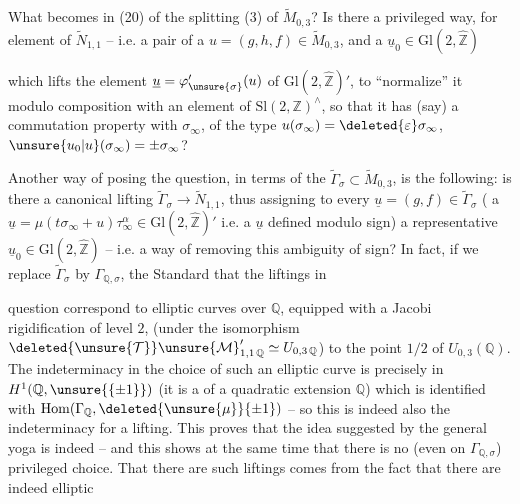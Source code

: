 What becomes in (20) of the splitting (3) of $\widetilde{M}_{0,3}$? Is there a privileged way, for  element of $\widetilde{N}_{1,1}$ -- i.e. a pair of a $u=(g,h,f)\in\widetilde{M}_{0,3}$, and a $\underline{u}_0\in\mathrm{Gl}(2,\widehat{\mathbb Z})$


which lifts the element $\underline{u}=\varphi'_{\unsure{\sigma}}(u)$ of $\mathrm{Gl}(2,\widehat{\mathbb Z})'$, to ``normalize'' it modulo  composition with an element of $\mathrm{Sl}(2,\mathbb Z)^\wedge$, so that it has  (say) a commutation property with $\sigma_\infty$, of the type $u(\sigma_\infty)=\deleted{\varepsilon}\sigma_\infty$,  $\unsure{u_0|u}(\sigma_\infty)=\pm\sigma_\infty$?

Another way of posing the question, in terms of the  $\widetilde{\Gamma}_\sigma\subset\widetilde{M}_{0,3}$, is the following: is there a canonical lifting $\widetilde{\Gamma}_\sigma\longrightarrow\widetilde{N}_{1,1}$, thus assigning to every $\underline{u}=(g,f)\in\widetilde{\Gamma}_\sigma$ ( a $\underline{u}=\mu(t\sigma_\infty+u)\tau_\infty^\alpha\in\mathrm{Gl}(2,\widehat{\mathbb Z})'$\unsure{,|\}}  i.e. a $\underline{u}$ defined modulo sign) a representative $\underline{u}_0\in\mathrm{Gl}(2,\widehat{\mathbb Z})$ -- i.e. a way of removing this ambiguity of sign? In fact, if we replace $\widetilde{\Gamma}_\sigma$ by $\Gamma_{\mathbb Q,\sigma}$, the Standard   that the liftings in


question  correspond to elliptic curves over $\mathbb Q$, equipped with a Jacobi rigidification of level $2$,  (under the isomorphism $\deleted{\unsure{\mathcal T}}\unsure{\mathcal M}_{1,1\,\mathbb Q}'\simeq U_{0,3\,\mathbb Q}$) to the point $1/2$ of $U_{0,3}(\mathbb Q)$. The indeterminacy in the choice of such an elliptic curve is precisely in $H^1(\mathbb Q,\unsure{\{\pm1\}})$ (it is a  of a quadratic extension  $\mathbb Q$) which is identified with $\mathrm{Hom}(\Gamma_{\mathbb Q},\deleted{\unsure{\mu}}\{\pm1\})$ -- so this is indeed also the indeterminacy for a lifting. This proves  that the idea suggested by the general yoga is indeed  -- and this shows at the same time that there is no (even on $\Gamma_{\mathbb Q,\sigma}$)  privileged choice. That there are such liftings  comes from the fact that there are indeed elliptic


